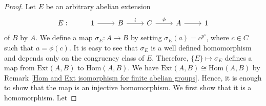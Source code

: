 \documentclass[preprint,sort&compress,12pt]{elsarticle}
\numberwithin{equation}{section}
\theoremstyle{definition}
\begin{document}
\begin{proof}
        Let $E$ be an arbitrary abelian extension
\[
\begin{tikzcd}
  E:& 1 \arrow[r] & B \arrow[r,"i"] & C \arrow[r, "\phi"] & A \ar[r] & 1
\end{tikzcd}
\]
of $B$ by $A$. We define a map $\sigma_{E}:A \to B$ by setting $\sigma_E(a)=c^{p^s}$, where $c \in C$ such that $a=\phi(c)$. 
It is easy to see that $\sigma_{E}$ is a well defined homomorphism and depends only on the congruency class of $E$. Therefore, $\{E\} \mapsto \sigma_E$ defines a map from $\mathrm{Ext}(A,B)$ to $\mathrm{Hom}(A,B)$. We have $\mathrm{Ext}(A,B) \cong \mathrm{Hom}(A,B)$ by Remark \ref{Hom and Ext isomorphism for finite abelian groups}. Hence, it is enough to show that the map is an injective homomorphism. We first show that it is a homomorphism. Let

\end{proof}
\end{document}
